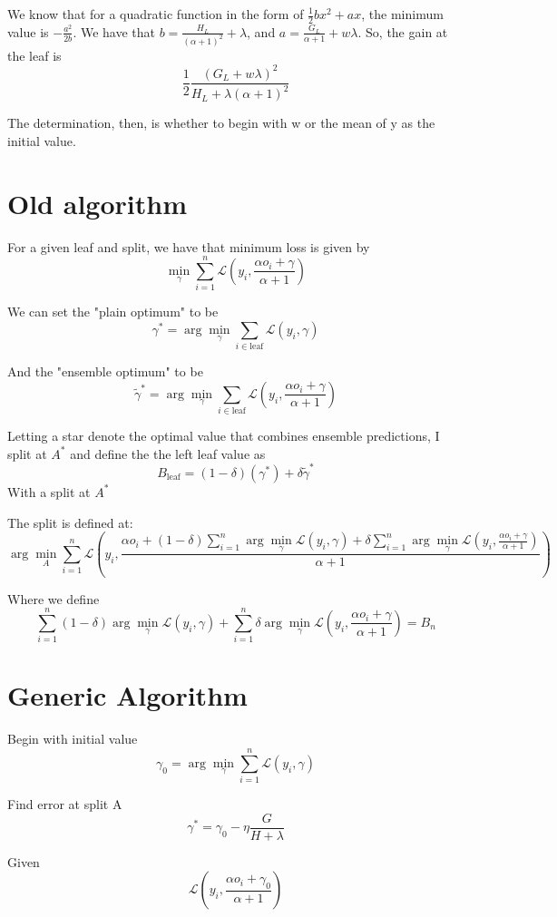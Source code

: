 \documentclass{article}
\begin{document}
We know that for a quadratic function in the form of $\frac{1}{2}bx^2 + ax$, the minimum value is $- \frac{a^2}{2b}$. 
We have that $b = \frac{H_L}{(\alpha + 1)^2} + \lambda$, and $a = \frac{G_L}{\alpha + 1} + w\lambda$. So, the gain at the leaf is \[
\frac{1}{2} \frac{(G_L + w\lambda)^2}{H_L + \lambda(\alpha + 1)^2}
\]

The determination, then, is whether to begin with w or the mean of y as the initial value.

\section*{Old algorithm}

For a given leaf and split, we have that minimum loss is given by \[
\min_{\gamma} \sum_{i=1}^{n} \mathcal{L}(y_i, \frac{\alpha o_i + \gamma}{\alpha + 1})
\]

We can set the "plain optimum" to be \[
\gamma^* = \arg \min_\gamma \sum_{i \in \text{leaf}} \mathcal{L}(y_i, \gamma)
\]

And the "ensemble optimum" to be \[
\tilde{\gamma}^* = \arg \min_\gamma \sum_{i \in \text{leaf}} \mathcal{L}(y_i, \frac{\alpha o_i + \gamma}{\alpha + 1})
\]

Letting a star denote the optimal value that combines ensemble predictions, I split at $A^*$ and define the 
the left leaf value as 
\[
B_{\text{leaf}} = (1 - \delta)(\gamma^*) + \delta \tilde{\gamma}^*
\]
With a split at $A^*$

The split is defined at:
\[
\arg\min_A \sum_{i=1}^n \mathcal{L}(y_i, \frac{\alpha o_i + (1 - \delta)\sum_{i=1}^n \arg\min_{\gamma} \mathcal{L}(y_i, \gamma) + \delta \sum_{i=1}^n \arg\min_\gamma \mathcal{L}(y_i, \frac{\alpha o_i + \gamma}{\alpha + 1})}{\alpha + 1})
\]

Where we define \[
    \sum_{i=1}^n (1 - \delta)\arg\min_{\gamma} \mathcal{L}(y_i, \gamma) + \sum_{i=1}^n \delta \arg\min_\gamma \mathcal{L}(y_i, \frac{\alpha o_i + \gamma}{\alpha + 1}) = B_n
\]

\section*{Generic Algorithm}
Begin with initial value \[
    \gamma_0 = \arg\min_{\gamma} \sum_{i=1}^n \mathcal{L}(y_i, \gamma)
\]

Find error at split A \[
\gamma^* = \gamma_0 - \eta \frac{G}{H + \lambda}
\]

Given \[
\mathcal{L}(y_i, \frac{\alpha o_i + \gamma_0}{\alpha + 1})
\]
\end{document}
